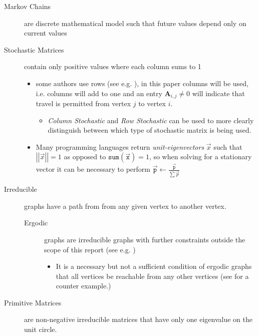\documentclass[11pt]{article}
\begin{document}
\begin{description}
\item[{Markov Chains}] are discrete mathematical model such that future values depend only on current values \cite[]{foussAlgorithmsModelsNetwork2016}
\item[{Stochastic Matrices}] contain only positive values where each column sums to 1 \cite{langvilleGooglePageRankScience2012,larsonElementaryLinearAlgebra1991}
\begin{itemize}
\item some authors use rows (see e.g. \cite[]{langvilleGooglePageRankScience2012}), in this paper columns will be used, i.e. columns will add to one and an entry \(\mathbf{A}_{i,j} \neq 0\) will indicate that travel is permitted from vertex \(j\) to vertex \(i\).
\begin{itemize}
\item \emph{Column Stochastic} and \emph{Row Stochastic} can be used to more clearly distinguish between which type of stochastic matrix is being used.
\end{itemize}
\item Many programming languages return \emph{unit-eigenvectors} \(\vec{x}\) such that \(\left\lvert \left\lvert \vec{x} \right\rvert \right\rvert = 1\) as opposed to \(\mathtt{sum} \left( \vec{\mathtt{x}}\right) = 1\), so when solving for a stationary vector it can be necessary to perform \(\vec{\mathtt{p}} \leftarrow \frac{\vec{\mathtt{p}}}{\sum \vec{p}}\)
\end{itemize}
\item[{Irreducible}] graphs have a path from from any given vertex to another vertex. \cite[]{langvilleGooglePageRankScience2012}
\begin{description}
\item[{Ergodic}] graphs are irreducible graphs with further constraints outside
the scope of this report (see e.g.
\cite{nathanaelackermancameronfreeralexkruckmanandrehanapatelProperlyErodicStructures2017,chenEigenvaluesInequalitiesErgodic2005})
\begin{itemize}
\item It is a necessary but not a sufficient condition of ergodic graphs that all vertices be reachable from any other vertices (see \cite{sazProbabilityTheoryThis} for a counter example.)
\end{itemize}
\end{description}
\item[{Primitive Matrices}] are non-negative irreducible matrices that have only one eigenvalue on the unit circle.

\end{description}
\end{document}
